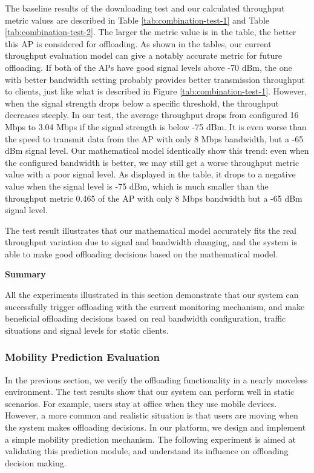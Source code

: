 \documentclass[english]{tktltiki}
\begin{document}
The baseline results of the downloading test and our calculated throughput metric values are described in Table \ref{tab:combination-test-1} and Table \ref{tab:combination-test-2}. The larger the metric value is in the table, the better this AP is considered for offloading. As shown in the tables, our current throughput evaluation model can give a notably accurate metric for future offloading. If both of the APs have good signal levels above -70 dBm, the one with better bandwidth setting probably provides better transmission throughput to clients, just like what is described in Figure \ref{tab:combination-test-1}. However, when the signal strength drops below a specific threshold, the throughput decreases steeply. In our test, the average throughput drops from configured 16 Mbps to 3.04 Mbps if the signal strength is below -75 dBm. It is even worse than the speed to transmit data from the AP with only 8 Mbps bandwidth, but a -65 dBm signal level. Our mathematical model identically show this trend: even when the configured bandwidth is better, we may still get a worse throughput metric value with a poor signal level. As displayed in the table, it drops to a negative value when the signal level is -75 dBm, which is much smaller than the throughput metric 0.465 of the AP with only 8 Mbps bandwidth but a -65 dBm signal level. 

The test result illustrates that our mathematical model accurately fits the real throughput variation due to signal and bandwidth changing, and the system is able to make good offloading decisions based on the mathematical model.


\vspace{1mm}

\textbf{Summary}

\vspace{1mm}


All the experiments illustrated in this section demonstrate that our system can successfully trigger offloading with the current monitoring mechanism, and make beneficial offloading decisions based on real bandwidth configuration, traffic situations and signal levels for static clients.


\subsubsection{Mobility Prediction Evaluation}


In the previous section, we verify the offloading functionality in a nearly moveless environment. The test results show that our system can perform well in static scenarios. For example, users stay at office when they use mobile devices. However, a more common and realistic situation is that users are moving when the system makes offloading decisions. In our platform, we design and implement a simple mobility prediction mechanism. The following experiment is aimed at validating this prediction module, and understand its influence on offloading decision making.
\end{document}
